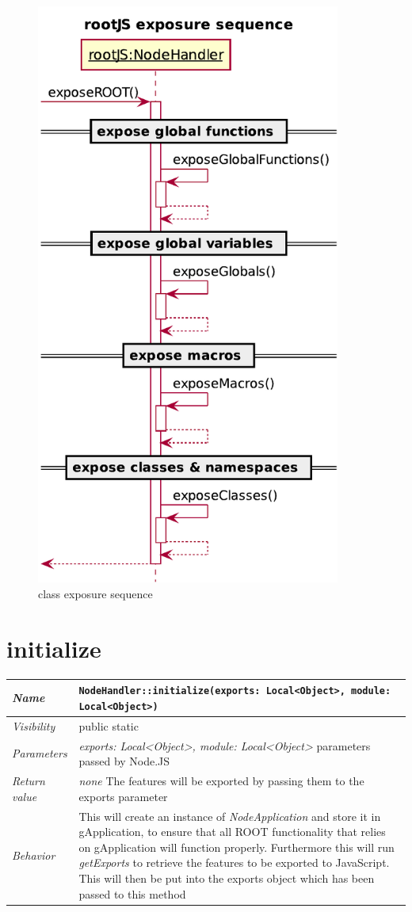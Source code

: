 \begin{figure}[H]
	\centering
	\includegraphics[width=10cm]{./latex/resources/exposureSequence.pdf}
	\caption{class exposure sequence}
\end{figure} \pagebreak
\section{initialize}
\begin{longtable}{p{3cm} @{\hskip 1cm} p{12cm}}
 \hline
\textit{Name} & \texttt{NodeHandler::initialize(exports: Local<Object>, module: Local<Object>)}\\
\hline
 \textit{Visibility} & public static\\
\hline
\textit{Parameters} & \textit{exports: Local<Object>, module: Local<Object>} parameters passed by Node.JS\\
\hline
\textit{Return value} & \textit{none} The features will be exported by passing them to the exports parameter \\
  \hline
 \textit{Behavior} & This will create an instance of \textit{NodeApplication} and store it in gApplication, to ensure that all ROOT functionality that relies on gApplication will function properly.
 Furthermore this will run \textit{getExports} to retrieve the features to be exported to JavaScript. This will then be put into the exports object which has been passed to this method \\
\hline
\end{longtable}
